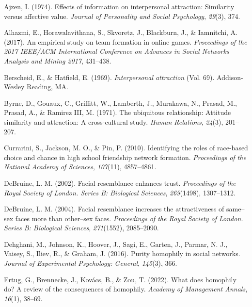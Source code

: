 \documentclass[
  man,
  floatsintext,
  longtable,
  nolmodern,
  notxfonts,
  notimes,
  draftfirst,
  colorlinks=true,linkcolor=blue,citecolor=blue,urlcolor=blue]{apa7}
\newlength{\cslhangindent}
\newenvironment{CSLReferences}[2] %
 {\begin{list}{}{%
  \setlength{\itemindent}{0pt}
  \setlength{\leftmargin}{0pt}
  \setlength{\parsep}{0pt}
  \ifodd #1
   \setlength{\leftmargin}{\cslhangindent}
   \setlength{\itemindent}{-1\cslhangindent}
  \fi
  \setlength{\itemsep}{#2\baselineskip}}}
 {\end{list}}
\begin{document}
\label{refs}
\begin{CSLReferences}{1}{0}
Ajzen, I. (1974). Effects of information on interpersonal attraction:
Similarity versus affective value. \emph{Journal of Personality and
Social Psychology}, \emph{29}(3), 374.

Alhazmi, E., Horawalavithana, S., Skvoretz, J., Blackburn, J., \&
Iamnitchi, A. (2017). An empirical study on team formation in online
games. \emph{Proceedings of the 2017 IEEE/ACM International Conference
on Advances in Social Networks Analysis and Mining 2017}, 431--438.

Berscheid, E., \& Hatfield, E. (1969). \emph{Interpersonal attraction}
(Vol. 69). Addison-Wesley Reading, MA.

Byrne, D., Gouaux, C., Griffitt, W., Lamberth, J., Murakawa, N., Prasad,
M., Prasad, A., \& Ramirez III, M. (1971). The ubiquitous relationship:
Attitude similarity and attraction: A cross-cultural study. \emph{Human
Relations}, \emph{24}(3), 201--207.

Currarini, S., Jackson, M. O., \& Pin, P. (2010). Identifying the roles
of race-based choice and chance in high school friendship network
formation. \emph{Proceedings of the National Academy of Sciences},
\emph{107}(11), 4857--4861.

DeBruine, L. M. (2002). Facial resemblance enhances trust.
\emph{Proceedings of the Royal Society of London. Series B: Biological
Sciences}, \emph{269}(1498), 1307--1312.

DeBruine, L. M. (2004). Facial resemblance increases the attractiveness
of same--sex faces more than other--sex faces. \emph{Proceedings of the
Royal Society of London. Series B: Biological Sciences},
\emph{271}(1552), 2085--2090.

Dehghani, M., Johnson, K., Hoover, J., Sagi, E., Garten, J., Parmar, N.
J., Vaisey, S., Iliev, R., \& Graham, J. (2016). Purity homophily in
social networks. \emph{Journal of Experimental Psychology: General},
\emph{145}(3), 366.

Ertug, G., Brennecke, J., Kovács, B., \& Zou, T. (2022). What does
homophily do? A review of the consequences of homophily. \emph{Academy
of Management Annals}, \emph{16}(1), 38--69.


\end{CSLReferences}
\end{document}
